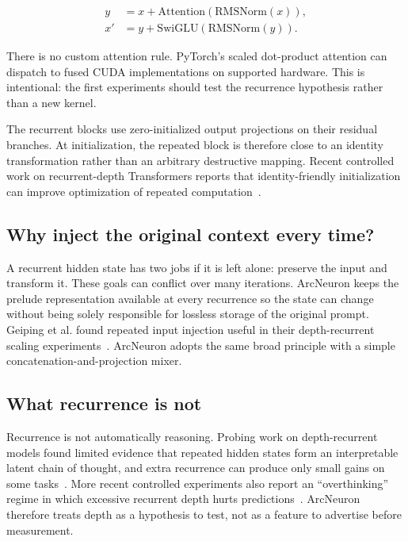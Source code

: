 \documentclass[10pt]{article}
\begin{document}
\begin{align}
    y &= x + \mathrm{Attention}(\mathrm{RMSNorm}(x)), \\
    x' &= y + \mathrm{SwiGLU}(\mathrm{RMSNorm}(y)).
\end{align}

There is no custom attention rule. PyTorch's scaled dot-product attention can dispatch to fused CUDA implementations on supported hardware. This is intentional: the first experiments should test the recurrence hypothesis rather than a new kernel.

The recurrent blocks use zero-initialized output projections on their residual branches. At initialization, the repeated block is therefore close to an identity transformation rather than an arbitrary destructive mapping. Recent controlled work on recurrent-depth Transformers reports that identity-friendly initialization can improve optimization of repeated computation~\cite{kohli2026loop}.

\subsection{Why inject the original context every time?}

A recurrent hidden state has two jobs if it is left alone: preserve the input and transform it. These goals can conflict over many iterations. ArcNeuron keeps the prelude representation available at every recurrence so the state can change without being solely responsible for lossless storage of the original prompt. Geiping et al. found repeated input injection useful in their depth-recurrent scaling experiments~\cite{geiping2025recurrent}. ArcNeuron adopts the same broad principle with a simple concatenation-and-projection mixer.

\subsection{What recurrence is not}

Recurrence is not automatically reasoning. Probing work on depth-recurrent models found limited evidence that repeated hidden states form an interpretable latent chain of thought, and extra recurrence can produce only small gains on some tasks~\cite{lu2025latent}. More recent controlled experiments also report an ``overthinking'' regime in which excessive recurrent depth hurts predictions~\cite{kohli2026loop}. ArcNeuron therefore treats depth as a hypothesis to test, not as a feature to advertise before measurement.
\end{document}
